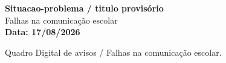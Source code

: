 \documentclass[11pt,a4paper]{article}
\begin{document}
\makelecturetitle
\begin{center}
{\large\bfseries Situacao-problema / titulo provisório}\\[3pt]
Falhas na comunicação escolar\\[3pt]
\textbf{Data: 17/08/2026}
\end{center}
\begin{notebox}[Tema]
Quadro Digital de avisos / Falhas na comunicação escolar.
\end{notebox}
\tableofcontents








\end{document}
